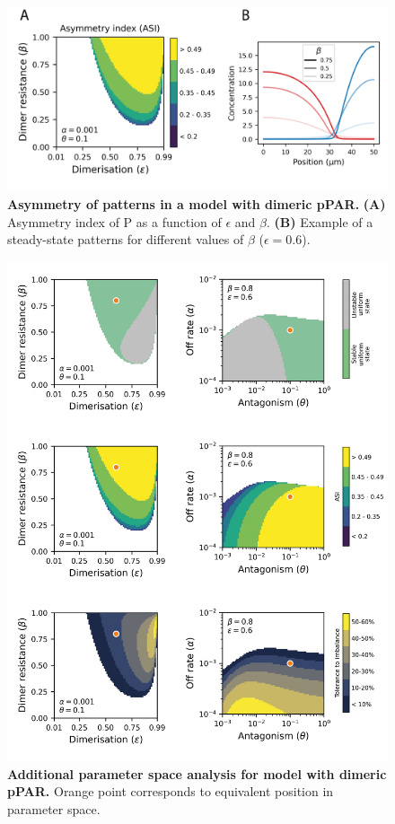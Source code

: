 \documentclass[12pt]{"report"}
\newcommand{\mycaption}[2]{\caption[#1]{\textbf{#1.} #2}}
\begin{document}
\begin{figure}
\includegraphics[scale=1]{dimer_mutual_antagonism_model_asi}
\centering
\mycaption{Asymmetry of patterns in a model with dimeric pPAR}{
\textbf{(A)} Asymmetry index of P as a function of $\epsilon$ and $\beta$.
\textbf{(B)} Example of a steady-state patterns for different values of $\beta$ ($\epsilon = 0.6$).
}
\label{fig:dimer_mutual_antagonism_model_asi}
\end{figure}

\begin{figure}
\includegraphics[scale=0.9]{dimer_model_more_paramspace}
\centering
\mycaption{Additional parameter space analysis for model with dimeric pPAR}{
Orange point corresponds to equivalent position in parameter space.
}
\label{fig:dimer_model_more_paramspace}
\end{figure}
\end{document}

